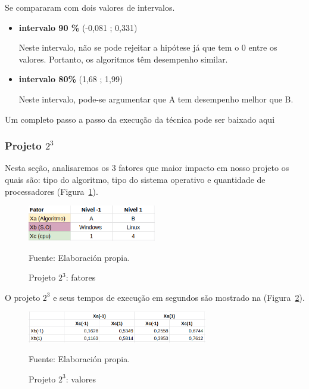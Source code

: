 \documentclass[12pt]{article}
\begin{document}
Se compararam com dois valores de intervalos.

\begin{itemize}
	\item \textbf{intervalo 90 \%}
		(-0,081 ; 0,331)

		Neste intervalo, não se pode rejeitar a hipótese já que tem o 0 entre os valores. Portanto, os algoritmos têm desempenho similar.\\
		
	\item \textbf{intervalo 80\%}
		(1,68 ; 1,99)
		
		Neste intervalo, pode-se argumentar que A tem desempenho melhor que B.\\	 
		 
\end{itemize}	

Um completo passo a passo da execução da técnica pode ser baixado aqui 

\subsubsection{Projeto ${2^3}$}

Nesta seção, analisaremos os 3 fatores que maior impacto em nosso projeto os quais são: tipo do algoritmo, tipo do sistema operativo e quantidade de processadores (Figura~\ref{figure:projeto_2_fatores}).

\begin{figure}[!ht]
	\begin{center}
		\includegraphics[width=0.5\textwidth]{images/projeto_2_fatores}
	\end{center}
	\begin{center}
		\caption{\label{figure:projeto_2_fatores}
			\small{Projeto ${2^3}$: fatores}}
		{\small{Fuente: Elaboración propia.}}
	\end{center}
\end{figure}

O projeto ${2^3}$ e seus tempos de execução em segundos são mostrado na (Figura~\ref{figure:projeto_2_valores}).

\begin{figure}[!ht]
	\begin{center}
		\includegraphics[width=0.7\textwidth]{images/projeto_2_valores}
	\end{center}
	\begin{center}
		\caption{\label{figure:projeto_2_valores}
			\small{Projeto ${2^3}$: valores}}
		{\small{Fuente: Elaboración propia.}}
	\end{center}
\end{figure}
\end{document}
